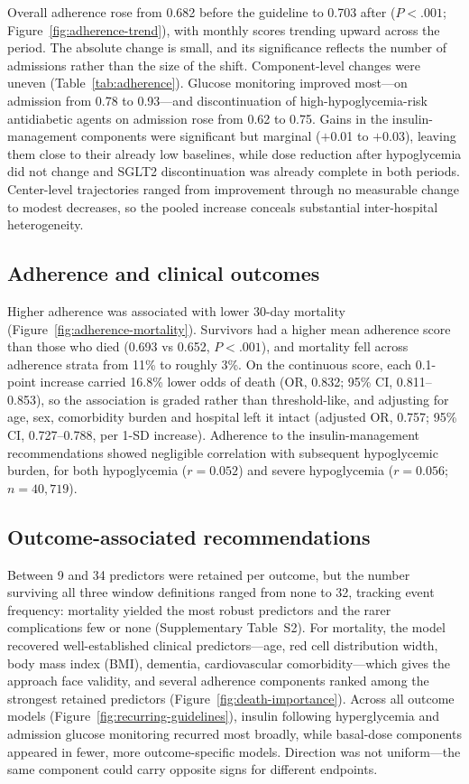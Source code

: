 Overall adherence rose from 0.682 before the guideline to 0.703 after
($P<.001$; Figure~\ref{fig:adherence-trend}), with monthly scores trending
upward across the period. The absolute change is small, and its significance
reflects the number of admissions rather than the size of the shift.
Component-level changes were uneven (Table~\ref{tab:adherence}). Glucose
monitoring improved most---on admission from 0.78 to 0.93---and discontinuation
of high-hypoglycemia-risk antidiabetic agents on admission rose from 0.62 to
0.75. Gains in the insulin-management components were significant but marginal
($+$0.01 to $+$0.03), leaving them close to their already low baselines, while
dose reduction after hypoglycemia did not change and SGLT2 discontinuation was
already complete in both periods. Center-level trajectories ranged from
improvement through no measurable change to modest decreases, so the pooled
increase conceals substantial inter-hospital heterogeneity.

\subsection{Adherence and clinical outcomes}

Higher adherence was associated with lower 30-day mortality
(Figure~\ref{fig:adherence-mortality}). Survivors had a higher mean adherence
score than those who died (0.693 vs 0.652, $P<.001$), and mortality fell across
adherence strata from 11\% to roughly 3\%. On the continuous score, each
0.1-point increase carried 16.8\% lower odds of death (OR, 0.832; 95\% CI,
0.811--0.853), so the association is graded rather than threshold-like, and
adjusting for age, sex, comorbidity burden and hospital left it intact
(adjusted OR, 0.757; 95\% CI, 0.727--0.788, per 1-SD increase). Adherence to the insulin-management
recommendations showed negligible correlation with subsequent hypoglycemic
burden, for both hypoglycemia ($r=0.052$) and severe hypoglycemia ($r=0.056$;
$n=40{,}719$).

\subsection{Outcome-associated recommendations}

Between 9 and 34 predictors were retained per outcome, but the number
surviving all three window definitions ranged from none to 32, tracking event
frequency: mortality yielded the most robust predictors and the rarer
complications few or none (Supplementary Table~S2). For mortality, the model
recovered well-established clinical predictors---age, red cell distribution
width, body mass index (BMI), dementia, cardiovascular comorbidity---which
gives the approach face validity, and several adherence components ranked among
the strongest retained predictors (Figure~\ref{fig:death-importance}). Across
all outcome models (Figure~\ref{fig:recurring-guidelines}), insulin following
hyperglycemia and admission glucose monitoring recurred most broadly, while
basal-dose components appeared in fewer, more outcome-specific models.
Direction was not uniform---the same component could carry opposite signs for
different endpoints.

